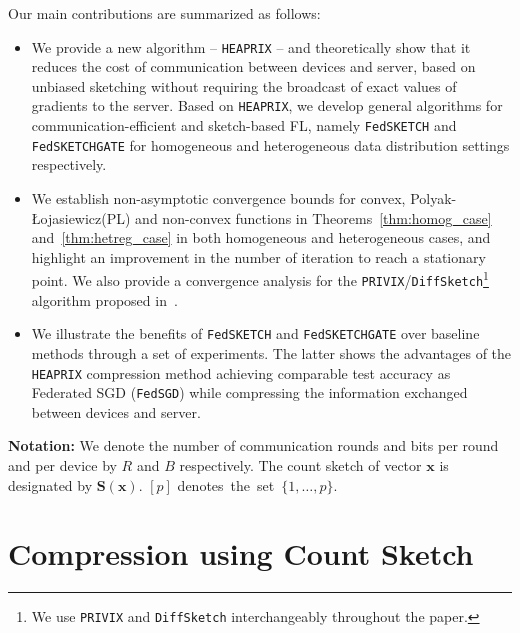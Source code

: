\documentclass{article} %
\newcommand{\pl}{Polyak-\L{}ojasiewicz}
\begin{document}
 Our main contributions are summarized as follows:
\begin{itemize}
    \item We provide a new algorithm -- \texttt{HEAPRIX} -- and theoretically show that it reduces the cost of communication between devices and server, based on unbiased sketching without requiring the broadcast of exact values of gradients to the server. 
    Based on \texttt{HEAPRIX}, we develop general algorithms for communication-efficient and sketch-based FL, namely \texttt{FedSKETCH} and \texttt{FedSKETCHGATE} for  homogeneous and heterogeneous data distribution settings respectively.
    \item We establish non-asymptotic convergence bounds for convex, \pl\:(PL) and non-convex functions in Theorems~\ref{thm:homog_case} and~\ref{thm:hetreg_case} in both homogeneous and heterogeneous cases, and highlight an improvement in the number of iteration to reach a stationary point.
We also provide a convergence analysis for the \texttt{PRIVIX}/\texttt{DiffSketch}\footnote{We use \texttt{PRIVIX} and \texttt{DiffSketch} \cite{li2019privacy} interchangeably throughout the paper.} algorithm proposed in~\cite{li2019privacy}.
    \item We illustrate the benefits of \texttt{FedSKETCH} and \texttt{FedSKETCHGATE} over baseline methods through a set of experiments. 
    The latter shows the advantages of the \texttt{HEAPRIX} compression method achieving comparable test accuracy as Federated SGD (\texttt{FedSGD}) while compressing the information exchanged between devices and server.
\end{itemize}


\noindent\textbf{Notation:} 
We denote the number of communication rounds and bits per round and per device by $R$ and $B$ respectively. 
The count sketch of  vector $\boldsymbol{x}$ is designated by $\mathbf{S}(\boldsymbol{x})$. $[p]$ denotes~the~set~$\{1,\dots,p\}$.

\vspace{-0.05in}
\section{Compression using Count Sketch}\label{sec:compression}
\vspace{-0.05in}
\end{document}
